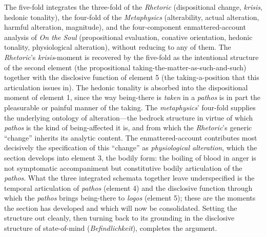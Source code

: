 \documentclass{article}
\begin{document}
The five-fold integrates the three-fold of the \textit{Rhetoric} (dispositional change, \textit{krisis}, hedonic tonality), the four-fold of the \textit{Metaphysics} (alterability, actual alteration, harmful alteration, magnitude), and the four-component enmattered-account analysis of \textit{On the Soul} (propositional evaluation, conative orientation, hedonic tonality, physiological alteration), without reducing to any of them. The \textit{Rhetoric}'s \textit{krisis}-moment is recovered by the five-fold as the intentional structure of the second element (the propositional taking-the-matter-as-such-and-such) together with the disclosive function of element 5 (the taking-a-position that this articulation issues in). The hedonic tonality is absorbed into the dispositional moment of element 1, since the way being-there is \textit{taken} in a \textit{pathos} is in part the pleasurable or painful manner of the taking. The \textit{metaphysics}' four-fold supplies the underlying ontology of alteration---the bedrock structure in virtue of which \textit{pathos} is the kind of being-affected it is, and from which the \textit{Rhetoric}'s generic ``change'' inherits its analytic content. The enmattered-account contributes most decisively the specification of this ``change'' as \textit{physiological alteration}, which the section develops into element 3, the bodily form: the boiling of blood in anger is not symptomatic accompaniment but constitutive bodily articulation of the \textit{pathos}. What the three integrated schemata together leave underspecified is the temporal articulation of \textit{pathos} (element 4) and the disclosive function through which the \textit{pathos} brings being-there to \textit{logos} (element 5); these are the moments the section has developed and which will now be consolidated. Setting the structure out cleanly, then turning back to its grounding in the disclosive structure of state-of-mind (\textit{Befindlichkeit}), completes the argument. 
\end{document}
